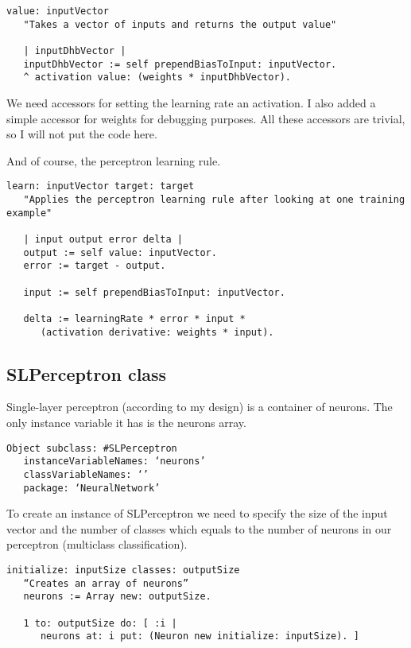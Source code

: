 \begin{lstlisting}
value: inputVector
   "Takes a vector of inputs and returns the output value"
 
   | inputDhbVector |
   inputDhbVector := self prependBiasToInput: inputVector.
   ^ activation value: (weights * inputDhbVector).
\end{lstlisting}

We need accessors for setting the learning rate an activation. I also added a simple accessor for weights for debugging purposes. All these accessors are trivial, so I will not put the code here.

And of course, the perceptron learning rule.

\begin{lstlisting}
learn: inputVector target: target
   "Applies the perceptron learning rule after looking at one training example"
 
   | input output error delta |
   output := self value: inputVector.
   error := target - output.
 
   input := self prependBiasToInput: inputVector.
  
   delta := learningRate * error * input * 
      (activation derivative: weights * input).
\end{lstlisting}
      
\subsection{SLPerceptron class}
Single-layer perceptron (according to my design) is a container of neurons. The only instance variable it has is the neurons array.

\begin{lstlisting}
Object subclass: #SLPerceptron
   instanceVariableNames: ‘neurons’
   classVariableNames: ‘’
   package: ‘NeuralNetwork’
\end{lstlisting}

To create an instance of SLPerceptron we need to specify the size of the input vector and the number of classes which equals to the number of neurons in our perceptron (multiclass classification).

\begin{lstlisting}
initialize: inputSize classes: outputSize
   “Creates an array of neurons”
   neurons := Array new: outputSize.
 
   1 to: outputSize do: [ :i |
      neurons at: i put: (Neuron new initialize: inputSize). ]
\end{lstlisting}

